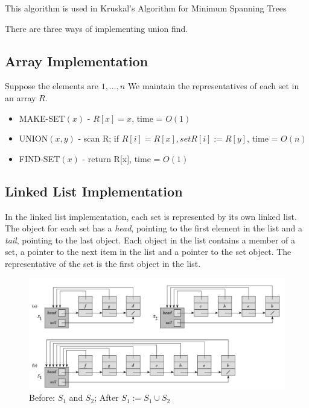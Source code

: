 \documentclass{article}
\theoremstyle{plain}
\theoremstyle{definition}
\begin{document}
    This algorithm is used in Kruskal's Algorithm for Minimum Spanning Trees
    \begin{algorithmic}[1]
            \EndFor
                \EndIf
            \EndFor
        \end{algorithmic}

    There are three ways of implementing union find. 
    \subsection{Array Implementation}
        Suppose the elements are $1,\ldots, n$
        We maintain the representatives of each set in an array $R$.
        \begin{itemize}
        \item MAKE-SET$(x)$ - $R[x] = x$, time = $O(1)$
        \item UNION$(x, y)$ - scan R; if $R[i] = R[x], set R[i] := R[y]$, time = $O(n)$
        \item FIND-SET$(x)$ - return R[x], time = $O(1)$
        \end{itemize}
    \subsection{Linked List Implementation}
        In the linked list implementation, each set is represented by its own linked list. The object for each set has a \textit{head}, pointing to the first element in the list and a \textit{tail}, pointing to the last object. Each object in the list contains a member of a set, a pointer to the next item in the list and a pointer to the set object. The representative of the set is the first object in the list. 

        \begin{figure}
            \centering
            \includegraphics[width=\linewidth]{images/linkedlist.png}
            \caption{Before: $S_1$ and $S_2$; After $S_1 := S_1 \cup S_2$}
            \label{fig:linkedlist}
        \end{figure}
\end{document}
